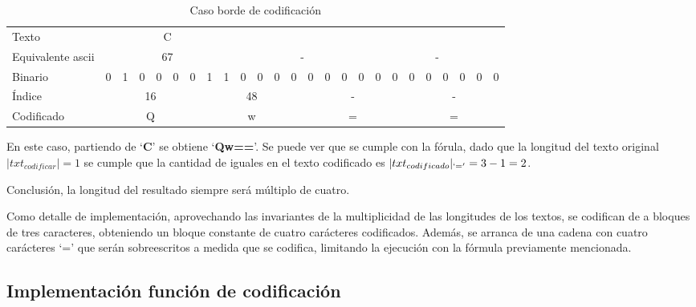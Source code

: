 \documentclass[titlepage,a4paper]{article}
\begin{document}
\begin{table}[H]
\centering
\setlength{\tabcolsep}{4pt}
\begin{tabular}{l|cccccc||cc|cccc||cccc|cc||cccccc}
Texto             & \multicolumn{8}{c|}{C}        & \multicolumn{8}{c|}{}        & \multicolumn{8}{c}{}        \\
Equivalente ascii & \multicolumn{8}{c|}{67}       & \multicolumn{8}{c|}{-}      & \multicolumn{8}{c}{-}      \\
 Binario           & 0 & 1 & 0 & 0 & 0 & 0 & 1 & 1 & \cellcolor[HTML]{EAECF0}0 & \cellcolor[HTML]{EAECF0}0 & \cellcolor[HTML]{EAECF0}0 & \cellcolor[HTML]{EAECF0}0 & \cellcolor[HTML]{EAECF0}0 & \cellcolor[HTML]{EAECF0}0 & \cellcolor[HTML]{EAECF0}0 & \cellcolor[HTML]{EAECF0}0 & \cellcolor[HTML]{EAECF0}0 & \cellcolor[HTML]{EAECF0}0 & \cellcolor[HTML]{EAECF0}0 & \cellcolor[HTML]{EAECF0}0 & \cellcolor[HTML]{EAECF0}0 & \cellcolor[HTML]{EAECF0}0 & \cellcolor[HTML]{EAECF0}0 & \cellcolor[HTML]{EAECF0}0 \\
Índice & \multicolumn{6}{c||}{16} & \multicolumn{6}{c||}{48} & \multicolumn{6}{c||}{-} & \multicolumn{6}{c}{-} \\
Codificado & \multicolumn{6}{c||}{Q} & \multicolumn{6}{c||}{w} & \multicolumn{6}{c||}{=} & \multicolumn{6}{c}{=}
\end{tabular}
\caption{Caso borde de codificación}
\label{table:caso_borde}
\centering
\end{table}

En este caso, partiendo de `\textbf{C}' se obtiene `\textbf{Qw==}'. Se puede ver que se cumple con la fórula, dado que la longitud del texto original $|txt_{codificar}| = 1$ se cumple que la cantidad de iguales en el texto codificado es $|txt_{codificado}|_{`='} = 3 - 1 = 2$.

Conclusión, la longitud del resultado siempre será múltiplo de cuatro.

Como detalle de implementación, aprovechando las invariantes de la multiplicidad de las longitudes de los textos, se codifican de a bloques de tres caracteres, obteniendo un bloque constante de cuatro carácteres codificados. Además, se arranca de una cadena con cuatro carácteres `=' que serán sobreescritos a medida que se codifica, limitando la ejecución con la fórmula previamente mencionada.


\subsection{Implementación función de codificación}
\end{document}

